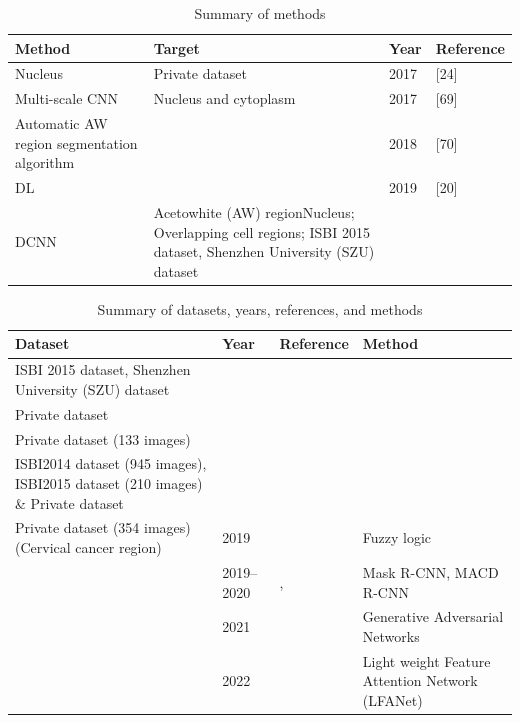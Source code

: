 \documentclass[final,5p,times,twocolumn,authoryear]{elsarticle}
\begin{document}
\begin{table}
\centering
\caption{Summary of methods}
\label{tab:summary}
\begin{tabular}{|l|l|l|l|}
\hline
Method & Target & Year & Reference \\
\hline
Nucleus & Private dataset & 2017 & [24] \\
\hline
Multi-scale CNN & Nucleus and cytoplasm & 2017 & [69] \\
\hline
Automatic AW region segmentation algorithm & & 2018 & [70] \\
\hline
DL & & 2019 & [20] \\
\hline
DCNN & Acetowhite (AW) regionNucleus; Overlapping cell regions; ISBI 2015 dataset, Shenzhen University (SZU) dataset & & \\
\hline
\end{tabular}
\end{table}

\begin{table}
\centering
\caption{Summary of datasets, years, references, and methods}
\label{tab:summary}
\begin{tabular}{llll}
\hline
Dataset & Year & Reference & Method \\
\hline
ISBI 2015 dataset, Shenzhen University (SZU) dataset & & & \\
Private dataset & & & \\
Private dataset (133 images) & & & \\
ISBI2014 dataset (945 images), ISBI2015 dataset (210 images) \& Private dataset & & & \\
Private dataset (354 images) (Cervical cancer region) & 2019 & \cite{ref71} & Fuzzy logic \\
 & 2019--2020 & \cite{ref72}, \cite{ref66} & Mask R-CNN, MACD R-CNN \\
 & 2021 & \cite{ref73} & Generative Adversarial Networks \\
 & 2022 & \cite{ref74} & Light weight Feature Attention Network (LFANet) \\
\hline
\end{tabular}
\end{table}
\end{document}
